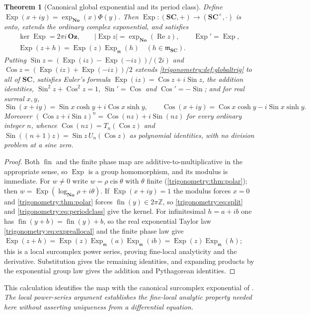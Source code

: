 \documentclass[11pt,letterpaper]{article}
\numberwithin{equation}{section}
\newtheorem{theorem}{Theorem}[section]
\theoremstyle{definition}
\theoremstyle{remark}
\newcommand{\No}{\mathbf{No}}
\newcommand{\SC}{\mathbf{SC}}
\newcommand{\Oz}{\mathbf{Oz}}
\newcommand{\Z}{\mathbb Z}
\newcommand{\mm}{\mathfrak m}
\newcommand{\fin}{\operatorname{fin}}
\newcommand{\re}{\operatorname{Re}}
\newcommand{\cis}{\operatorname{cis}}
\newcommand{\Exp}{\operatorname{Exp}}
\newcommand{\Ex}{\operatorname{Exp}_{\mm}}
\newcommand{\Sin}{\operatorname{Sin}}
\newcommand{\Cos}{\operatorname{Cos}}
\begin{document}
\begin{theorem}[Canonical global exponential and its period class]
\label{trigonometry:thm:globalexp}
Define $\Exp(x+iy)=\exp_{\No}(x)\Phi(y)$. Then $\Exp:(\SC,+)\to(\SC^\times,\cdot)$ is onto, extends
the ordinary complex exponential, and satisfies
\begin{equation}\label{trigonometry:eq:expkernel}
\begin{gathered}
 \ker\Exp=2\pi i\,\Oz,\qquad |\Exp z|=\exp_{\No}(\re z),\qquad
 \Exp'=\Exp,\\
 \Exp(z+h)=\Exp(z)\Ex(h)\quad(h\in\mm_{\SC}).
\end{gathered}
\end{equation}
Putting $\Sin z=(\Exp(iz)-\Exp(-iz))/(2i)$ and $\Cos z=(\Exp(iz)+\Exp(-iz))/2$ extends
\cref{trigonometry:def:globaltrig} to all of $\SC$, satisfies Euler's formula
$\Exp(iz)=\Cos z+i\Sin z$, the addition identities, $\Sin^2z+\Cos^2z=1$, $\Sin'=\Cos$ and
$\Cos'=-\Sin$; and for real surreal $x,y$,
\begin{equation}\label{trigonometry:eq:trighyper}
 \Sin(x+iy)=\Sin x\cosh y+i\Cos x\sinh y,\qquad
 \Cos(x+iy)=\Cos x\cosh y-i\Sin x\sinh y .
\end{equation}
Moreover $(\Cos z+i\Sin z)^n=\Cos(nz)+i\Sin(nz)$ for every ordinary integer $n$, whence
$\Cos(nz)=T_n(\Cos z)$ and $\Sin((n+1)z)=\Sin z\,U_n(\Cos z)$ as polynomial identities, with no
division problem at a sine zero.
\end{theorem}
\begin{proof}
Both $\fin$ and the finite phase map are additive-to-multiplicative in the appropriate sense, so
$\Exp$ is a group homomorphism, and its modulus is immediate. For $w\ne0$ write $w=\rho\cis\theta$
with $\theta$ finite (\cref{trigonometry:thm:polar}); then $w=\Exp(\log_{\No}\rho+i\theta)$. If
$\Exp(x+iy)=1$ the modulus forces $x=0$ and \cref{trigonometry:thm:polar} forces
$\fin(y)\in2\pi\Z$, so \cref{trigonometry:eq:split} and \cref{trigonometry:eq:periodclass} give the
kernel. For infinitesimal $h=a+ib$ one has $\fin(y+b)=\fin(y)+b$, so the real exponential Taylor
law \cref{trigonometry:eq:expreallocal} and the finite phase law give
$\Exp(z+h)=\Exp(z)\Ex(a)\Ex(ib)=\Exp(z)\Ex(h)$; this is a local surcomplex power series, proving
fine-local analyticity and the derivative. Substitution gives the remaining identities, and
expanding products by the exponential group law gives the addition and Pythagorean identities.
\end{proof}
This calculation identifies the map with the canonical surcomplex exponential of
\cite[Theorem 11.1]{EK}. \emph{The local power-series argument establishes the fine-local analytic
property needed here without asserting uniqueness from a differential equation.}
\end{document}
